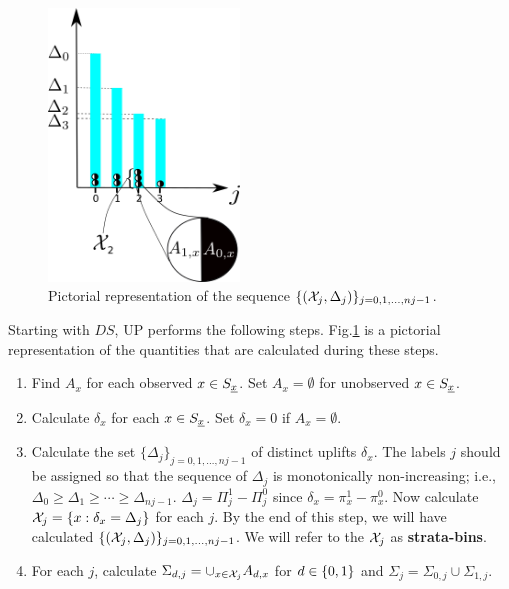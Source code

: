 \begin{figure}[h!]
\centering
\includegraphics[width=2in]
{uplift/uplift-bins.png}
\caption{
Pictorial
representation
of the sequence
$\{({\cal X}_j, \Delta_j)\}_{j=0,1, \ldots, nj-1}$.
}
\label{fig-uplift-bins}
\end{figure}


Starting with $DS$,
UP performs the following steps.
Fig.\ref{fig-uplift-bins}
is a pictorial representation
of the quantities
that are calculated
during these steps.

\begin{enumerate}
\item Find $A_x$ 
for each observed $x\in S_{\underline{x}}$.
Set $A_x=\emptyset$ for unobserved $x\in S_{\underline{x}}$.
 
\item Calculate $\delta_x$
for each $x\in S_{\underline{x}}$.
Set $\delta_x=0$ if $A_x=\emptyset$.

\item Calculate
the set $\{\Delta_j\}_{j=0, 1, \ldots, nj-1}$
of distinct uplifts $\delta_x$.
The labels 
$j$ should be assigned
so that the sequence of
$\Delta_j$
is monotonically non-increasing; i.e.,
$\Delta_0 \geq \Delta_{1}\geq\cdots \geq \Delta_{nj-1}$.
 $\Delta_j = \Pi_j^1-\Pi_j^0$
since $\delta_x=\pi^1_x - \pi^0_x$.
Now calculate
${\cal X}_j =\{ x: \delta_x =\Delta_j\}$ for each $j$.
By the end of this step,
we will have calculated 
$\{({\cal X}_j, \Delta_j)\}_{j=0,1, \ldots, nj-1}$.
We will refer to the ${\cal X}_j$
as {\bf strata-bins}.
\item
For each $j$,
calculate $\Sigma_{d,j}=\cup_{x\in {\cal X}_j}A_{d,x}$
for $d\in\{0,1\}$
and $\Sigma_{j}=\Sigma_{0,j}
\cup \Sigma_{1,j}$.
\end{enumerate}


